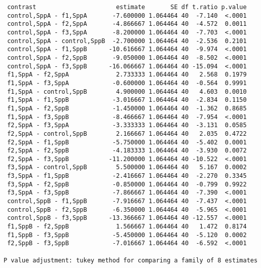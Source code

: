 \documentclass[11pt]{article}
\begin{document}
    
    \begin{verbatim}
 contrast                      estimate       SE df t.ratio p.value
 control,SppA - f1,SppA       -7.600000 1.064464 40  -7.140  <.0001
 control,SppA - f2,SppA       -4.866667 1.064464 40  -4.572  0.0011
 control,SppA - f3,SppA       -8.200000 1.064464 40  -7.703  <.0001
 control,SppA - control,SppB  -2.700000 1.064464 40  -2.536  0.2101
 control,SppA - f1,SppB      -10.616667 1.064464 40  -9.974  <.0001
 control,SppA - f2,SppB       -9.050000 1.064464 40  -8.502  <.0001
 control,SppA - f3,SppB      -16.066667 1.064464 40 -15.094  <.0001
 f1,SppA - f2,SppA             2.733333 1.064464 40   2.568  0.1979
 f1,SppA - f3,SppA            -0.600000 1.064464 40  -0.564  0.9991
 f1,SppA - control,SppB        4.900000 1.064464 40   4.603  0.0010
 f1,SppA - f1,SppB            -3.016667 1.064464 40  -2.834  0.1150
 f1,SppA - f2,SppB            -1.450000 1.064464 40  -1.362  0.8685
 f1,SppA - f3,SppB            -8.466667 1.064464 40  -7.954  <.0001
 f2,SppA - f3,SppA            -3.333333 1.064464 40  -3.131  0.0585
 f2,SppA - control,SppB        2.166667 1.064464 40   2.035  0.4722
 f2,SppA - f1,SppB            -5.750000 1.064464 40  -5.402  0.0001
 f2,SppA - f2,SppB            -4.183333 1.064464 40  -3.930  0.0072
 f2,SppA - f3,SppB           -11.200000 1.064464 40 -10.522  <.0001
 f3,SppA - control,SppB        5.500000 1.064464 40   5.167  0.0002
 f3,SppA - f1,SppB            -2.416667 1.064464 40  -2.270  0.3345
 f3,SppA - f2,SppB            -0.850000 1.064464 40  -0.799  0.9922
 f3,SppA - f3,SppB            -7.866667 1.064464 40  -7.390  <.0001
 control,SppB - f1,SppB       -7.916667 1.064464 40  -7.437  <.0001
 control,SppB - f2,SppB       -6.350000 1.064464 40  -5.965  <.0001
 control,SppB - f3,SppB      -13.366667 1.064464 40 -12.557  <.0001
 f1,SppB - f2,SppB             1.566667 1.064464 40   1.472  0.8174
 f1,SppB - f3,SppB            -5.450000 1.064464 40  -5.120  0.0002
 f2,SppB - f3,SppB            -7.016667 1.064464 40  -6.592  <.0001

P value adjustment: tukey method for comparing a family of 8 estimates 
    \end{verbatim}

\[\]
    
\end{document}
